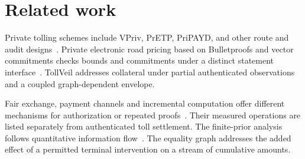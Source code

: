 \section{Related work}
\label{sec:related}

Private tolling schemes include VPriv, PrETP, PriPAYD, and other route and audit designs~\cite{vpriv2009,pretp2010,pripayd2011}. Private electronic road pricing based on Bulletproofs and vector commitments checks bounds and commitments under a distinct statement interface~\cite{desmet2024}. TollVeil addresses collateral under partial authenticated observations and a coupled graph-dependent envelope.

Fair exchange, payment channels and incremental computation offer different mechanisms for authorization or repeated proofs~\cite{fairstream2023,cape2025,fairrelay2026,micronova2025}. Their measured operations are listed separately from authenticated toll settlement. The finite-prior analysis follows quantitative information flow~\cite{smith2009qif,alvim2012g,alvim2020book}. The equality graph addresses the added effect of a permitted terminal intervention on a stream of cumulative amounts.
